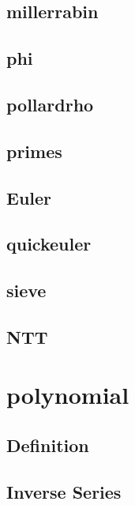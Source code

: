 \documentclass[a4paper,10pt,twocolumn,oneside]{article}
\begin{document}
    \subsection{millerrabin}
    

    \subsection{phi}
    

    \subsection{pollardrho}
    

    \subsection{primes}
    

    \subsection{Euler}
    

    \subsection{quickeuler}
    

    \subsection{sieve}
    

    \subsection{NTT}
    

\section{polynomial}
    \subsection{Definition}
    
    
    \subsection{Inverse Series}
    
\end{document}
